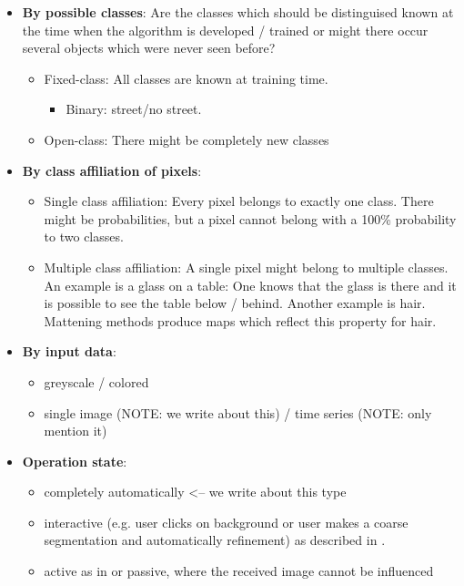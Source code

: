 \begin{itemize}
    \item \textbf{By possible classes}: Are the classes which should be distinguised
          known at the time when the algorithm is developed / trained or might
          there occur several objects which were never seen before?
          \begin{itemize}
              \item Fixed-class: All classes are known at training time.
              \begin{itemize}
                  \item Binary: street/no street.
              \end{itemize}
              \item Open-class: There might be completely new classes
          \end{itemize}
    \item \textbf{By class affiliation of pixels}:
        \begin{itemize}
            \item Single class affiliation: Every pixel belongs to exactly one class. There might
                  be probabilities, but a pixel cannot belong with a 100\%
                  probability to two classes.
            \item Multiple class affiliation: A single pixel might belong to
                  multiple classes. An example is a glass on a table: One
                  knows that the glass is there and it is possible to see the
                  table below / behind. Another example is hair. Mattening
                  methods produce maps which reflect this property for hair.\cite{levin2008spectral}
        \end{itemize}
    \item \textbf{By input data}:
          \begin{itemize}
              \item greyscale / colored
              \item single image (NOTE: we write about this) / time series (NOTE: only mention it)
          \end{itemize}
    \item \textbf{Operation state}:
        \begin{itemize}
            \item completely automatically <-- we write about this type
            \item interactive (e.g. user clicks on background or user makes a
                  coarse segmentation and automatically refinement) as
                  described in
                  \cite{protiere2007interactive,rother2004grabcut}.
            \item active as in
                  \cite{schiebener2011segmentation,schiebener2012discovery} or
                  passive, where the received image cannot be influenced
        \end{itemize}
\end{itemize}

